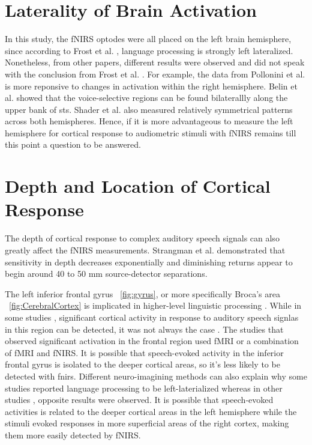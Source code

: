 \section{Laterality of Brain Activation}
In this study, the fNIRS optodes were all placed on the left brain hemisphere, since according to Frost et al. \citeyear{Frost1999-vs}, language processing is strongly left lateralized. Nonetheless, from other papers, different results were observed and did not speak with the conclusion from Frost et al. \citeyear{Frost1999-vs}. For example, the data from Pollonini et al. \citeyear{Pollonini2013} is more reponsive to changes in activation within the right hemisphere. Belin et al. \citeyear{Belin2000} showed that the voice-selective regions can be found bilaterallly along the upper bank of \acrshort{sts}. Shader et al. \cite{Shader2021} also measured relatively symmetrical patterns across both hemispheres. Hence, if it is more advantageous to measure the left hemisphere for cortical response to audiometric stimuli with fNIRS remains till this point a question to be answered.

\section{Depth and Location of Cortical Response} %
The depth of cortical response to complex auditory speech signals can also greatly affect the fNIRS measurements. Strangman et al. \citeyear{Strangman2013} demonstrated that sensitivity in depth decreases exponentially and diminishing returns appear to begin around 40 to 50 mm source-detector separations.

The left inferior frontal gyrus ~\ref{fig:gyrus}, or more specifically Broca's area ~\ref{fig:CerebralCortex} is implicated in higher-level linguistic processing \cite{Belin2000}. While in some studies \cite{Wijayasir2017} \cite{Zhou2018}, significant cortical activity in response to auditory speech signlas in this region can be detected, it was not always the case \cite{Musthtaq2019}. The studies that observed significant activation in the frontal region used fMRI or a combination of fMRI and fNIRS. It is possible that speech-evoked activity in the inferior frontal gyrus is isolated to the deeper cortical areas, so it's less likely to be detected with \acrshort{fnirs}. Different neuro-imagining methods can also explain why some studies \cite {Frost1999-vs} reported language processing to be left-laterialized whereas in other studies \cite{Shader2021}, opposite results were observed. It is possible that speech-evoked activities is related to the deeper cortical areas in the left hemisphere while the stimuli evoked responses in more superficial areas of the right cortex, making them more easily detected by fNIRS.


